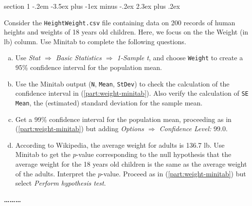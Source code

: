 \documentclass[11pt]{exam}
\makeatletter
\newenvironment{problem}{\@startsection
       {section}
       {1}
       {-.2em}
       {-3.5ex plus -1ex minus -.2ex}
       {2.3ex plus .2ex}
       {\pagebreak[3]%
       \large\bf\noindent{Problem }
       }
       }
       {%
       \begin{center}\large\bf \ldots\ldots\ldots\end{center}}
\makeatother
\begin{document}
\begin{problem}{}

Consider the \texttt{HeightWeight.csv} file containing data on 200 records of human heights and weights of 18 years
old children. Here, we focus on the the Weight (in lb) column. Use Minitab to complete the following questions.

\begin{enumerate}[(a)]

\item \label{part:weight-minitab} Use \textit{Stat $\Rightarrow$ Basic Statistics $\Rightarrow$ 1-Sample
t}, and choose \texttt{Weight} to create a
95\% confidence interval for the population mean.


\item Use the Minitab output (\texttt{N}, \texttt{Mean}, \texttt{StDev}) to check the calculation of the confidence
interval in (\ref{part:weight-minitab}).  Also verify the calculation
of \texttt{SE Mean}, the (estimated) standard deviation for the sample mean.

\item \label{part:weight-confint-99} Get a 99\% confidence interval for the population mean, proceeding as in
(\ref{part:weight-minitab}) but adding \textit{Options $\Rightarrow$
Confidence Level:} 99.0.

\item  According to Wikipedia, the average weight for adults is 136.7 lb. 
    Use Minitab to get the $p$-value corresponding to the null hypothesis that the average weight for the 18 years old children is the same as
    the average weight of the adults. Interpret the $p$-value.  Proceed as in (\ref{part:weight-minitab}) but select \textit{Perform hypothesis test}.
\end{enumerate}

\end{problem}
\end{document}
